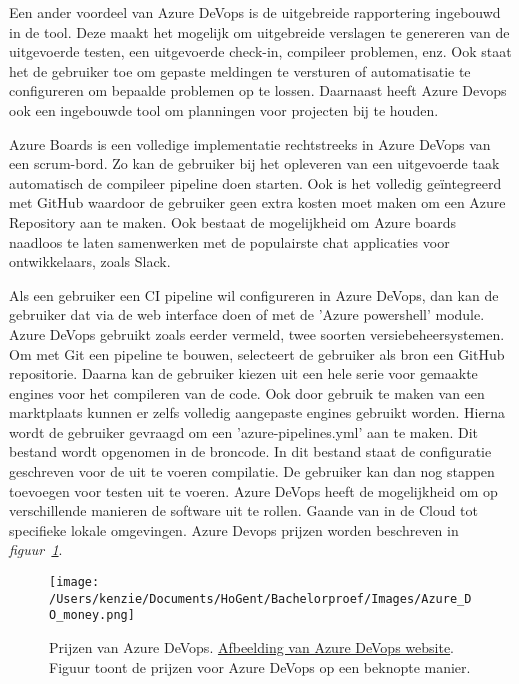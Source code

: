 Een ander voordeel van Azure DeVops is de uitgebreide rapportering ingebouwd in de tool. Deze maakt het mogelijk om uitgebreide verslagen te genereren van de uitgevoerde testen, een uitgevoerde check-in, compileer problemen, enz. Ook staat het de gebruiker toe om gepaste meldingen te versturen of automatisatie te configureren om bepaalde problemen op te lossen. Daarnaast heeft Azure Devops ook een ingebouwde tool om planningen voor projecten bij te houden.

Azure Boards is een volledige implementatie rechtstreeks in Azure DeVops van een scrum-bord. Zo kan de gebruiker bij het opleveren van een uitgevoerde taak automatisch de compileer pipeline doen starten. Ook is het volledig geïntegreerd met GitHub waardoor de gebruiker geen extra kosten moet maken om een Azure Repository aan te maken. Ook bestaat de mogelijkheid om Azure boards naadloos te laten samenwerken met de populairste chat applicaties voor ontwikkelaars, zoals Slack.

Als een gebruiker een CI pipeline wil configureren in Azure DeVops, dan kan de gebruiker dat via de web interface doen of met de 'Azure powershell' module. Azure DeVops gebruikt zoals eerder vermeld, twee soorten versiebeheersystemen. Om met Git een pipeline te bouwen, selecteert de gebruiker als bron een GitHub repositorie. Daarna kan de gebruiker kiezen uit een hele serie voor gemaakte engines voor het compileren van de code. Ook door gebruik te maken van een marktplaats kunnen er zelfs volledig aangepaste engines gebruikt worden. Hierna wordt de gebruiker gevraagd om een 'azure-pipelines.yml' aan te maken. Dit bestand wordt opgenomen in de broncode. In dit bestand staat de configuratie geschreven voor de uit te voeren compilatie. De gebruiker kan dan nog stappen toevoegen voor testen uit te voeren. Azure DeVops heeft de mogelijkheid om op verschillende manieren de software uit te rollen. Gaande van in de Cloud tot specifieke lokale omgevingen. Azure Devops prijzen worden beschreven in \emph{figuur~\ref{fig:A_DO_Money}}.

\begin{figure}[!htbp]
    \centering
    \texttt{[image: /Users/kenzie/Documents/HoGent/Bachelorproef/Images/Azure\_DO\_money.png]}
    \caption{Prijzen van Azure DeVops. \href{https://azure.microsoft.com/nl-nl/pricing/details/devops/azure-devops-services/}{Afbeelding van Azure DeVops website}. Figuur toont de prijzen voor Azure DeVops op een beknopte manier.}
    \label{fig:A_DO_Money}
\end{figure}


